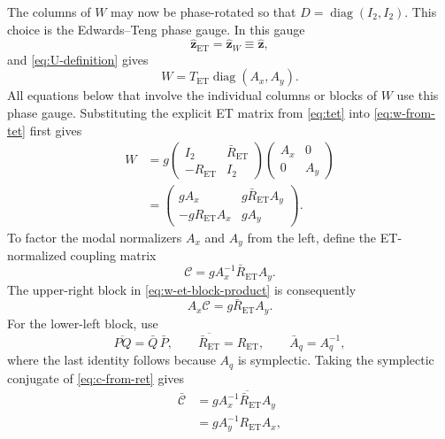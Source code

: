 \documentclass[11pt,a4paper]{article}
\newcommand{\diag}{\operatorname{diag}}
\newcommand{\mat}[1]{\bm{#1}}
\begin{document}
The columns of $W$ may now be phase-rotated so that
$D=\diag(I_2,I_2)$.  This choice is
the Edwards--Teng phase gauge.  In this gauge
\begin{equation}
 \widehat{\mat z}_{\mathrm{ET}}=\widehat{\mat z}_W
 \equiv\widehat{\mat z},
\end{equation}
and \cref{eq:U-definition} gives
\begin{equation}
 \boxed{
 W=T_{\mathrm{ET}}\diag(A_x,A_y).
 }
 \label{eq:w-from-tet}
\end{equation}
All equations below that involve the individual columns or blocks of $W$ use
this phase gauge.
Substituting the explicit ET matrix from \cref{eq:tet} into
\cref{eq:w-from-tet} first gives
\begin{equation}
 \begin{aligned}
 W
 &=g
 \begin{pmatrix}
  I_2&\bar R_{\mathrm{ET}}\\
  -R_{\mathrm{ET}}&I_2
 \end{pmatrix}
 \begin{pmatrix}A_x&0\\0&A_y\end{pmatrix}\\
 &=\begin{pmatrix}
  g A_x&g\bar R_{\mathrm{ET}}A_y\\
  -g R_{\mathrm{ET}}A_x&g A_y
 \end{pmatrix}.
 \end{aligned}
 \label{eq:w-et-block-product}
\end{equation}
To factor the modal normalizers $A_x$ and $A_y$ from the left, define the
ET-normalized coupling matrix
\begin{equation}
 \boxed{
 \mathcal C=g A_x^{-1}\bar R_{\mathrm{ET}}A_y.
 }
 \label{eq:c-from-ret}
\end{equation}
The upper-right block in \cref{eq:w-et-block-product} is consequently
\begin{equation}
 A_x\mathcal C=g\bar R_{\mathrm{ET}}A_y.
\end{equation}
For the lower-left block, use
\begin{equation}
 \overline{PQ}=\bar Q\,\bar P,
 \qquad
 \overline{\bar R_{\mathrm{ET}}}=R_{\mathrm{ET}},
 \qquad
 \bar A_q=A_q^{-1},
\end{equation}
where the last identity follows because $A_q$ is symplectic.  Taking the
symplectic conjugate of \cref{eq:c-from-ret} gives
\begin{align}
 \bar{\mathcal C}
 &=g
 \overline{A_x^{-1}\bar R_{\mathrm{ET}}A_y}
 \nonumber\\
 &=g A_y^{-1}R_{\mathrm{ET}}A_x,
\end{align}
\end{document}
